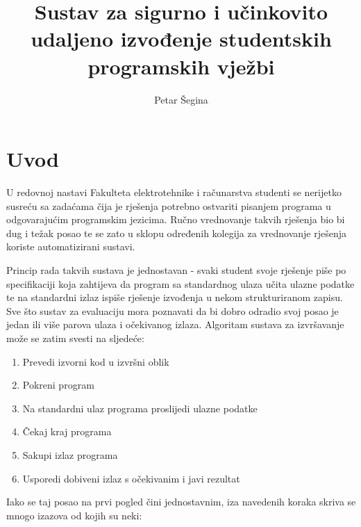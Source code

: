 \documentclass[times, utf8, zavrsni]{fer}
\begin{document}

\title{Sustav za sigurno i učinkovito udaljeno izvođenje studentskih programskih vježbi}

\author{Petar Šegina}

\maketitle

\izvornik

\zahvala{}

\tableofcontents

\chapter{Uvod}

U redovnoj nastavi Fakulteta elektrotehnike i računarstva studenti se nerijetko susreću sa zadaćama čija je rješenja potrebno ostvariti pisanjem programa u odgovarajućim programskim jezicima. Ručno vrednovanje takvih rješenja bio bi dug i težak posao te se zato u sklopu određenih kolegija za vrednovanje rješenja koriste automatizirani sustavi.

Princip rada takvih sustava je jednostavan - svaki student svoje rješenje piše po specifikaciji koja zahtijeva da program sa standardnog ulaza učita ulazne podatke te na standardni izlaz ispiše rješenje izvođenja u nekom strukturiranom zapisu. Sve što sustav za evaluaciju mora poznavati da bi dobro odradio svoj posao je jedan ili više parova ulaza i očekivanog izlaza. Algoritam sustava za izvršavanje može se zatim svesti na sljedeće:

\begin{enumerate}
\item Prevedi izvorni kod u izvršni oblik
\item Pokreni program
\item Na standardni ulaz programa proslijedi ulazne podatke
\item Čekaj kraj programa
\item Sakupi izlaz programa
\item Usporedi dobiveni izlaz s očekivanim i javi rezultat
\end{enumerate}

Iako se taj posao na prvi pogled čini jednostavnim, iza navedenih koraka skriva se mnogo izazova od kojih su neki:
\end{document}
